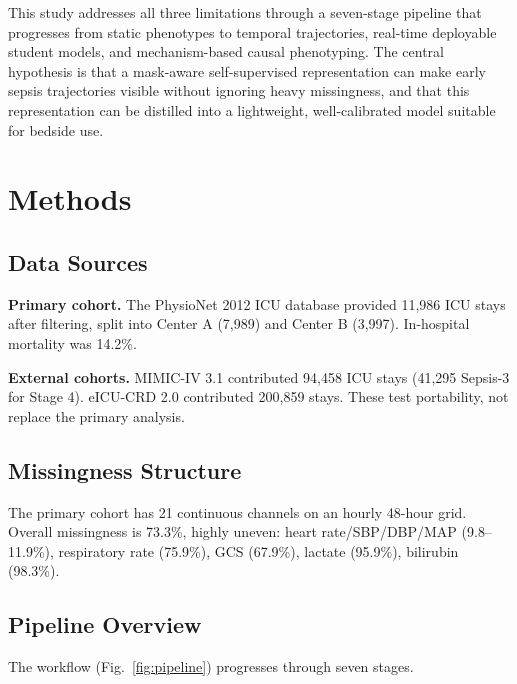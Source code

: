 \documentclass[conference,a4paper]{IEEEtran}
\begin{document}
This study addresses all three limitations through a seven-stage pipeline that progresses from static phenotypes to temporal trajectories, real-time deployable student models, and mechanism-based causal phenotyping. The central hypothesis is that a mask-aware self-supervised representation can make early sepsis trajectories visible without ignoring heavy missingness, and that this representation can be distilled into a lightweight, well-calibrated model suitable for bedside use.

\section{Methods}

\subsection{Data Sources}

\textbf{Primary cohort.} The PhysioNet 2012 ICU database \cite{silva2012} provided 11,986 ICU stays after filtering, split into Center A (7,989) and Center B (3,997). In-hospital mortality was 14.2\%.

\textbf{External cohorts.} MIMIC-IV 3.1 \cite{johnson2023} contributed 94,458 ICU stays (41,295 Sepsis-3 for Stage 4). eICU-CRD 2.0 \cite{pollard2018} contributed 200,859 stays. These test portability, not replace the primary analysis.

\subsection{Missingness Structure}

The primary cohort has 21 continuous channels on an hourly 48-hour grid. Overall missingness is 73.3\%, highly uneven: heart rate/SBP/DBP/MAP (9.8--11.9\%), respiratory rate (75.9\%), GCS (67.9\%), lactate (95.9\%), bilirubin (98.3\%).

\subsection{Pipeline Overview}

The workflow (Fig.~\ref{fig:pipeline}) progresses through seven stages.
\end{document}
